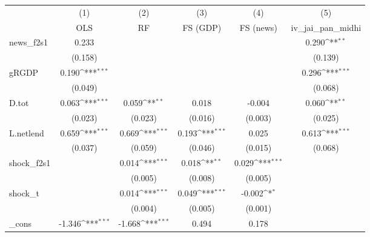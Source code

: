 {
\def\sym#1{\ifmmode^{#1}\else\(^{#1}\)\fi}
\begin{tabular}{l*{5}{c}}
\toprule
            &\multicolumn{1}{c}{(1)}&\multicolumn{1}{c}{(2)}&\multicolumn{1}{c}{(3)}&\multicolumn{1}{c}{(4)}&\multicolumn{1}{c}{(5)}\\
            &\multicolumn{1}{c}{OLS}&\multicolumn{1}{c}{RF}&\multicolumn{1}{c}{FS (GDP)}&\multicolumn{1}{c}{FS (news)}&\multicolumn{1}{c}{iv\_jai\_pan\_midhi}\\
\midrule
news\_f2s1   &       0.233         &                     &                     &                     &       0.290\sym{**} \\
            &     (0.158)         &                     &                     &                     &     (0.139)         \\
\addlinespace
gRGDP       &       0.190\sym{***}&                     &                     &                     &       0.296\sym{***}\\
            &     (0.049)         &                     &                     &                     &     (0.068)         \\
\addlinespace
D.tot       &       0.063\sym{***}&       0.059\sym{**} &       0.018         &      -0.004         &       0.060\sym{**} \\
            &     (0.023)         &     (0.023)         &     (0.016)         &     (0.003)         &     (0.025)         \\
\addlinespace
L.netlend   &       0.659\sym{***}&       0.669\sym{***}&       0.193\sym{***}&       0.025         &       0.613\sym{***}\\
            &     (0.037)         &     (0.059)         &     (0.046)         &     (0.015)         &     (0.068)         \\
\addlinespace
shock\_f2s1  &                     &       0.014\sym{***}&       0.018\sym{**} &       0.029\sym{***}&                     \\
            &                     &     (0.005)         &     (0.008)         &     (0.005)         &                     \\
\addlinespace
shock\_t     &                     &       0.014\sym{***}&       0.049\sym{***}&      -0.002\sym{*}  &                     \\
            &                     &     (0.004)         &     (0.005)         &     (0.001)         &                     \\
\addlinespace
\_cons      &      -1.346\sym{***}&      -1.668\sym{***}&       0.494         &       0.178         &                     \\

\end{tabular}}
